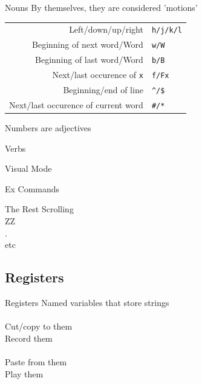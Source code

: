 \documentclass{beamer}
\begin{document}
            \begin{frame}{Nouns}
                By themselves, they are considered 'motions'
                \begin{table}
                    \centering
                    \begin{tabular}{r|p{7cm}}
                        Left/down/up/right & \texttt{h/j/k/l} \\[.3cm]
                        Beginning of next word/Word & \texttt{w/W} \\[.3cm]
                        Beginning of last word/Word & \texttt{b/B} \\[.3cm]
                        Next/last occurence of \texttt{x} & \texttt{f/Fx} \\[.3cm]
                        Beginning/end of line & \texttt{\textasciicircum /\$ } \\[.3cm]
                        Next/last occurence of current word & \texttt{\#/*} \\
                    \end{tabular}
                \end{table}
                Numbers are adjectives
            \end{frame}

            \begin{frame}{Verbs}
            \end{frame}

            \begin{frame}{Visual Mode}
            \end{frame}

            \begin{frame}{Ex Commands}
            \end{frame}

            \begin{frame}{The Rest}
                Scrolling \\
                ZZ \\
                . \\
                etc
            \end{frame}

        \subsection{Registers}

            \begin{frame}{Registers}
                Named variables that store strings \\~\\
                Cut/copy to them \\
                Record them \\~\\
                Paste from them \\
                Play them
            \end{frame}
\end{document}
